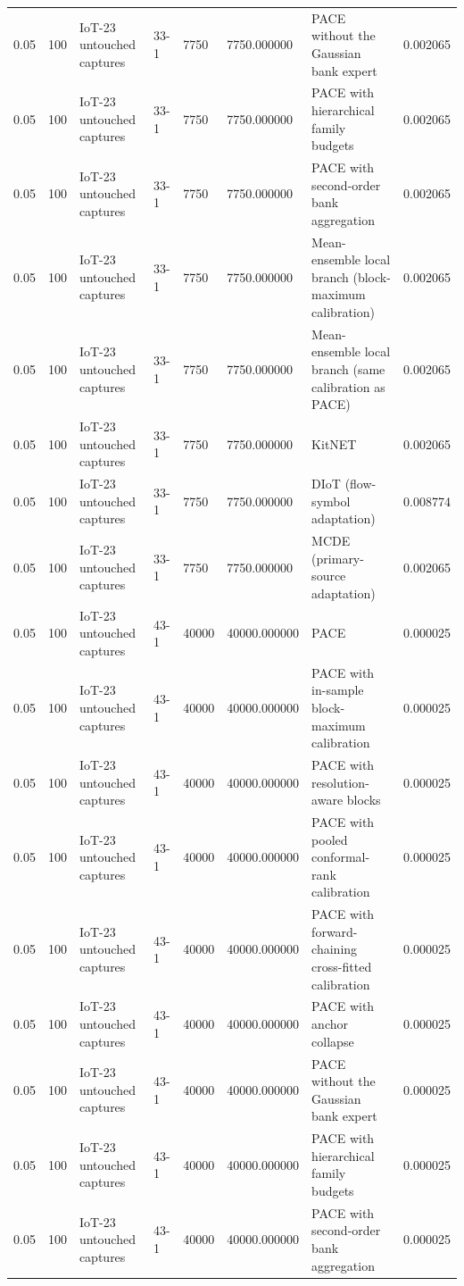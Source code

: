 \begin{tabular}{llllllll}
0.05 & 100 & IoT-23 untouched captures & 33-1 & 7750 & 7750.000000 & PACE without the Gaussian bank expert & 0.002065 \\
0.05 & 100 & IoT-23 untouched captures & 33-1 & 7750 & 7750.000000 & PACE with hierarchical family budgets & 0.002065 \\
0.05 & 100 & IoT-23 untouched captures & 33-1 & 7750 & 7750.000000 & PACE with second-order bank aggregation & 0.002065 \\
0.05 & 100 & IoT-23 untouched captures & 33-1 & 7750 & 7750.000000 & Mean-ensemble local branch (block-maximum calibration) & 0.002065 \\
0.05 & 100 & IoT-23 untouched captures & 33-1 & 7750 & 7750.000000 & Mean-ensemble local branch (same calibration as PACE) & 0.002065 \\
0.05 & 100 & IoT-23 untouched captures & 33-1 & 7750 & 7750.000000 & KitNET & 0.002065 \\
0.05 & 100 & IoT-23 untouched captures & 33-1 & 7750 & 7750.000000 & DIoT (flow-symbol adaptation) & 0.008774 \\
0.05 & 100 & IoT-23 untouched captures & 33-1 & 7750 & 7750.000000 & MCDE (primary-source adaptation) & 0.002065 \\
0.05 & 100 & IoT-23 untouched captures & 43-1 & 40000 & 40000.000000 & PACE & 0.000025 \\
0.05 & 100 & IoT-23 untouched captures & 43-1 & 40000 & 40000.000000 & PACE with in-sample block-maximum calibration & 0.000025 \\
0.05 & 100 & IoT-23 untouched captures & 43-1 & 40000 & 40000.000000 & PACE with resolution-aware blocks & 0.000025 \\
0.05 & 100 & IoT-23 untouched captures & 43-1 & 40000 & 40000.000000 & PACE with pooled conformal-rank calibration & 0.000025 \\
0.05 & 100 & IoT-23 untouched captures & 43-1 & 40000 & 40000.000000 & PACE with forward-chaining cross-fitted calibration & 0.000025 \\
0.05 & 100 & IoT-23 untouched captures & 43-1 & 40000 & 40000.000000 & PACE with anchor collapse & 0.000025 \\
0.05 & 100 & IoT-23 untouched captures & 43-1 & 40000 & 40000.000000 & PACE without the Gaussian bank expert & 0.000025 \\
0.05 & 100 & IoT-23 untouched captures & 43-1 & 40000 & 40000.000000 & PACE with hierarchical family budgets & 0.000025 \\
0.05 & 100 & IoT-23 untouched captures & 43-1 & 40000 & 40000.000000 & PACE with second-order bank aggregation & 0.000025 \\

\end{tabular}

